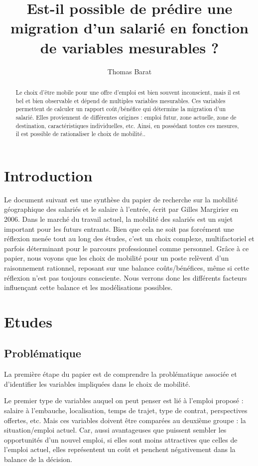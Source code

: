 \documentclass{article}
\title{Est-il possible de prédire une migration d'un salarié en fonction de variables mesurables ?}
\author{Thomas Barat}
\begin{document}
\maketitle

\begin{abstract}
Le choix d'être mobile pour une offre d'emploi est bien souvent inconscient, mais il est bel et bien observable et dépend de multiples variables mesurables. Ces variables permettent de calculer un rapport coût/bénéfice qui détermine la migration d'un salarié.
Elles proviennent de différentes origines : emploi futur, zone actuelle, zone de destination, caractéristiques individuelles, etc. Ainsi, en possédant toutes ces mesures, il est possible de rationaliser le choix de mobilité..
\end{abstract}

\section{Introduction}

Le document suivant est une synthèse du papier de recherche sur la mobilité géographique des salariés et le salaire à l'entrée, écrit par Gilles Margirier en 2006.
Dans le marché du travail actuel, la mobilité des salariés est un sujet important pour les futurs entrants. Bien que cela ne soit pas forcément une réflexion menée tout au long des études, c’est un choix complexe, multifactoriel et parfois déterminant pour le parcours professionnel comme personnel.
Grâce à ce papier, nous voyons que les choix de mobilité pour un poste relèvent d’un raisonnement rationnel, reposant sur une balance coûts/bénéfices, même si cette réflexion n’est pas toujours consciente. Nous verrons donc les différents facteurs influençant cette balance et les modélisations possibles.

\section{Etudes}

\subsection{Problématique}

La première étape du papier est de comprendre la problématique associée et d’identifier les variables impliquées dans le choix de mobilité.

Le premier type de variables auquel on peut penser est lié à l’emploi proposé : salaire à l’embauche, localisation, temps de trajet, type de contrat, perspectives offertes, etc. Mais ces variables doivent être comparées au deuxième groupe : la situation/emploi actuel.
Car, aussi avantageuses que puissent sembler les opportunités d’un nouvel emploi, si elles sont moins attractives que celles de l’emploi actuel, elles représentent un coût et penchent négativement dans la balance de la décision.
\end{document}
